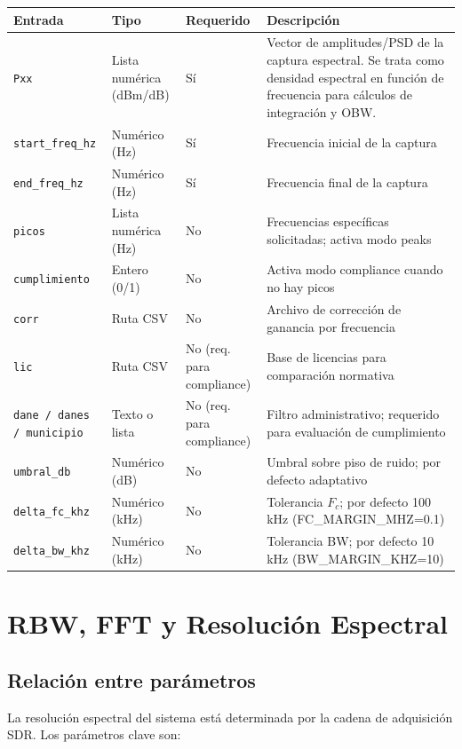 \begin{tabular}{p{4cm}p{3cm}p{2cm}p{6cm}}
\textbf{Entrada} & \textbf{Tipo} & \textbf{Requerido} & \textbf{Descripción} \\
\hline
\texttt{Pxx} & Lista numérica (dBm/dB) & Sí & Vector de amplitudes/PSD de la captura espectral. Se trata como densidad espectral en función de frecuencia para cálculos de integración y OBW. \\
\texttt{start\_freq\_hz} & Numérico (Hz) & Sí & Frecuencia inicial de la captura \\
\texttt{end\_freq\_hz} & Numérico (Hz) & Sí & Frecuencia final de la captura \\
\texttt{picos} & Lista numérica (Hz) & No & Frecuencias específicas solicitadas; activa modo peaks \\
\texttt{cumplimiento} & Entero (0/1) & No & Activa modo compliance cuando no hay picos \\
\texttt{corr} & Ruta CSV & No & Archivo de corrección de ganancia por frecuencia \\
\texttt{lic} & Ruta CSV & No (req. para compliance) & Base de licencias para comparación normativa \\
\texttt{dane / danes / municipio} & Texto o lista & No (req. para compliance) & Filtro administrativo; requerido para evaluación de cumplimiento \\
\texttt{umbral\_db} & Numérico (dB) & No & Umbral sobre piso de ruido; por defecto adaptativo \\
\texttt{delta\_fc\_khz} & Numérico (kHz) & No & Tolerancia $F_c$; por defecto 100 kHz (FC\_MARGIN\_MHZ=0.1) \\
\texttt{delta\_bw\_khz} & Numérico (kHz) & No & Tolerancia BW; por defecto 10 kHz (BW\_MARGIN\_KHZ=10) \\
\end{tabular}

\section{RBW, FFT y Resolución Espectral}

\subsection{Relación entre parámetros}

La resolución espectral del sistema está determinada por la cadena de adquisición SDR. Los parámetros clave son:

